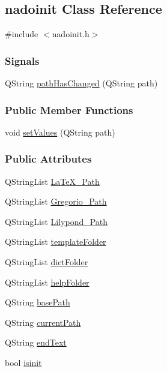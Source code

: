\hypertarget{classnadoinit}{\subsection{nadoinit \-Class \-Reference}
\label{classnadoinit}
}


{\ttfamily \#include $<$nadoinit.\-h$>$}

\subsubsection*{\-Signals}
\begin{DoxyCompactItemize}
\item 
\-Q\-String \hyperlink{classnadoinit_aa9cdbefb183971caf78cd365e26544ed}{path\-Has\-Changed} (\-Q\-String path)
\end{DoxyCompactItemize}
\subsubsection*{\-Public \-Member \-Functions}
\begin{DoxyCompactItemize}
\item 
void \hyperlink{classnadoinit_ade412f43acbc31bfb6a470be1a7655b5}{set\-Values} (\-Q\-String path)
\end{DoxyCompactItemize}
\subsubsection*{\-Public \-Attributes}
\begin{DoxyCompactItemize}
\item 
\-Q\-String\-List \hyperlink{classnadoinit_a69347b16c4be15c8923a6d8785d7af9f}{\-La\-Te\-X\-\_\-\-Path}
\item 
\-Q\-String\-List \hyperlink{classnadoinit_a20f5cafb5bf05df6d89deb43b595a192}{\-Gregorio\-\_\-\-Path}
\item 
\-Q\-String\-List \hyperlink{classnadoinit_a9971fc91456e4cf24927c42471c32e64}{\-Lilypond\-\_\-\-Path}
\item 
\-Q\-String\-List \hyperlink{classnadoinit_a0ea5be240109fb2373f7544bb68a1e4a}{template\-Folder}
\item 
\-Q\-String\-List \hyperlink{classnadoinit_a50b65542641d11f5184a6aa615ba9500}{dict\-Folder}
\item 
\-Q\-String\-List \hyperlink{classnadoinit_a6fd6457d2be15bfa6c13f0d8deba6a08}{help\-Folder}
\item 
\-Q\-String \hyperlink{classnadoinit_a4081a7d29969048e9b81dc07d1421521}{base\-Path}
\item 
\-Q\-String \hyperlink{classnadoinit_a60c7078faeb9e398181107cbd1604ac0}{current\-Path}
\item 
\-Q\-String \hyperlink{classnadoinit_a9a7c2dc3edc0b30cfdb83d2cd8a7b87b}{end\-Text}
\item 
bool \hyperlink{classnadoinit_ac5ebbf07fa035e4dffa8d387ddb22fb7}{isinit}
\end{DoxyCompactItemize}


